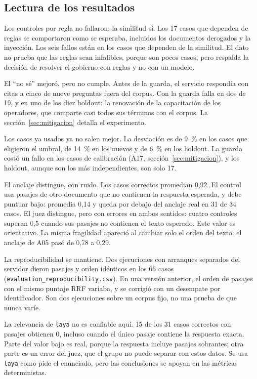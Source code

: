 \subsection{Lectura de los resultados}\label{sec:lectura}

Los controles por regla no fallaron; la similitud sí. Los 17 casos que dependen de reglas se comportaron como se esperaba, incluidos los documentos derogados y la inyección. Los seis fallos están en los casos que dependen de la similitud. El dato no prueba que las reglas sean infalibles, porque son pocos casos, pero respalda la decisión de resolver el gobierno con reglas y no con un modelo.

El ``no sé'' mejoró, pero no cumple. Antes de la guarda, el servicio respondía con citas a cinco de nueve preguntas fuera del corpus. Con la guarda falla en dos de 19, y en uno de los diez holdout: la renovación de la capacitación de los operadores, que comparte casi todos sus términos con el corpus. La sección~\ref{sec:mitigacion} detalla el experimento.

Los casos ya usados ya no salen mejor. La desviación es de 9~\% en los casos que eligieron el umbral, de 14~\% en los nuevos y de 6~\% en los holdout. La guarda costó un fallo en los casos de calibración (A17, sección~\ref{sec:mitigacion}), y los holdout, aunque son los más independientes, son solo 17.

El anclaje distingue, con ruido. Los casos correctos promedian 0,92. El control usa pasajes de otro documento que no contienen la respuesta esperada, y debe puntuar bajo: promedia 0,14 y queda por debajo del anclaje real en 31 de 34 casos. El juez distingue, pero con errores en ambos sentidos: cuatro controles superan 0,5 cuando sus pasajes no contienen el texto esperado. Este valor es orientativo. La misma fragilidad apareció al cambiar solo el orden del texto: el anclaje de A05 pasó de 0,78 a 0,29.

La reproducibilidad se mantiene. Dos ejecuciones con arranques separados del servidor dieron pasajes y orden idénticos en los 66 casos (\texttt{evaluation\_reproducibility.csv}). En una versión anterior, el orden de pasajes con el mismo puntaje RRF variaba, y se corrigió con un desempate por identificador. Son dos ejecuciones sobre un corpus fijo, no una prueba de que nunca varíe.

La relevancia de \texttt{laya} no es confiable aquí. 15 de los 31 casos correctos con pasajes obtienen 0, incluso cuando el único pasaje contiene la respuesta exacta. Parte del valor bajo es real, porque la respuesta incluye pasajes sobrantes; otra parte es un error del juez, que el grupo no puede separar con estos datos. Se usa \texttt{laya} como pide el enunciado, pero las conclusiones se apoyan en las métricas deterministas.

